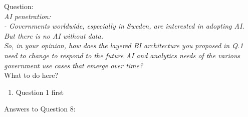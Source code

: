 Question:\\
\emph{
    AI penetration:\\
- Governments worldwide, especially in Sweden, are interested in adopting AI.
But there is no AI without data.\\ So, in your opinion, how does the layered BI
architecture you proposed in Q.1 need to change to respond to the future AI and
analytics needs of the various government use cases that emerge over time?
}\\

What to do here?
\begin{enumerate}
    \item Question 1 first
  \end{enumerate}

\newpage Answers to Question 8:

